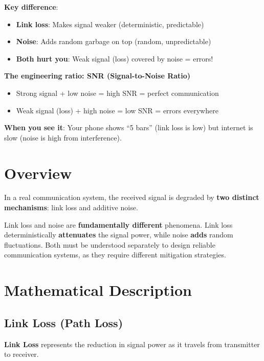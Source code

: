 \begin{nontechnical}
\textbf{Key difference}:
\begin{itemize}
\item \textbf{Link loss}: Makes signal weaker (deterministic, predictable)
\item \textbf{Noise}: Adds random garbage on top (random, unpredictable)
\item \textbf{Both hurt you}: Weak signal (loss) covered by noise = errors!
\end{itemize}

\textbf{The engineering ratio: SNR (Signal-to-Noise Ratio)}
\begin{itemize}
\item Strong signal + low noise = high SNR = perfect communication
\item Weak signal (loss) + high noise = low SNR = errors everywhere
\end{itemize}

\textbf{When you see it}: Your phone shows ``5 bars'' (link loss is low) but internet is slow (noise is high from interference).
\end{nontechnical}

\section{Overview}

In a real communication system, the received signal is degraded by \textbf{two distinct mechanisms}: link loss and additive noise.

\begin{keyconcept}
Link loss and noise are \textbf{fundamentally different} phenomena. Link loss deterministically \textbf{attenuates} the signal power, while noise \textbf{adds} random fluctuations. Both must be understood separately to design reliable communication systems, as they require different mitigation strategies.
\end{keyconcept}

\section{Mathematical Description}

\subsection{Link Loss (Path Loss)}\label{link-loss-path-loss}

\textbf{Link Loss} represents the reduction in signal power as it
travels from transmitter to receiver.

